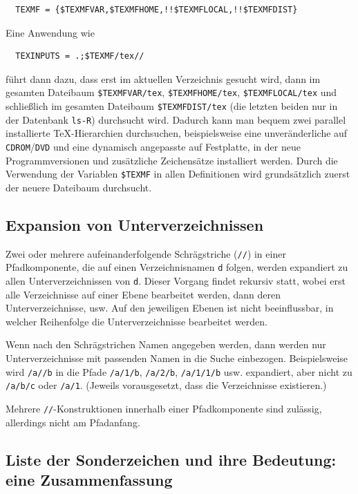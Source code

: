 \documentclass[12pt,ngerman,a4paper,fullparskip]{report}
\newcommand{\acro}[1]{\texttt{#1}}
\newcommand{\code}[1]{\texttt{#1}}
\newcommand{\file}[1]{\texttt{#1}}
\newcommand{\dirname}[1]{\texttt{#1}}
\newcommand{\var}[1]{\texttt{#1}}
\providecommand*{\DVD}{\acro{DVD}\xspace}
\begin{document}
\begin{verbatim}
  TEXMF = {$TEXMFVAR,$TEXMFHOME,!!$TEXMFLOCAL,!!$TEXMFDIST}
\end{verbatim}

Eine Anwendung wie

\begin{verbatim}
  TEXINPUTS = .;$TEXMF/tex//
\end{verbatim}

führt dann dazu, dass erst im aktuellen Verzeichnis gesucht wird, dann
im gesamten Dateibaum \code{\$TEXMFVAR/tex}, \code{\$TEXMFHOME/tex}, \code{\$TEXMFLOCAL/tex} und schließlich im gesamten Dateibaum \dirname{\$TEXMFDIST/tex} (die letzten beiden nur in der Datenbank \file{ls-R}) durchsucht wird. Dadurch kann man bequem zwei parallel installierte \TeX-Hierarchien durchsuchen, beispielsweise eine unveränderliche auf \acro{CDROM}/{\DVD} und eine dynamisch angepasste auf Festplatte, in der neue Programmversionen und zusätzliche Zeichensätze installiert werden. Durch die Verwendung der Variablen \code{\$TEXMF} in allen Definitionen wird grundsätzlich zuerst der neuere Dateibaum durchsucht.


\subsection{Expansion von Unterverzeichnissen}\label{sec:subdirectory-expansion}

Zwei oder mehrere aufeinanderfolgende Schrägstriche (\texttt{//}) in einer Pfadkomponente, die auf einen Verzeichnisnamen \var{d} folgen, werden expandiert zu allen Unterverzeichnissen von \var{d}. Dieser Vorgang findet rekursiv statt, wobei erst alle Verzeichnisse auf einer Ebene bearbeitet werden, dann deren Unterverzeichnisse, usw. Auf den jeweiligen Ebenen ist nicht beeinflussbar, in welcher Reihenfolge die Unterverzeichnisse bearbeitet werden.

Wenn nach den Schrägstrichen Namen angegeben werden, dann werden nur
Unterverzeichnisse mit passenden Namen in die Suche einbezogen. Beispielsweise wird \code{/a//b} in die Pfade \file{/a/1/b}, \file{/a/2/b}, \file{/a/1/1/b} usw. expandiert, aber nicht zu \file{/a/b/c} oder \file{/a/1}. (Jeweils vorausgesetzt, dass die Verzeichnisse existieren.)

Mehrere \code{//}-Konstruktionen innerhalb einer Pfadkomponente
sind zulässig, allerdings nicht am Pfadanfang.


\subsection{Liste der Sonderzeichen und ihre Bedeutung: eine Zusammenfassung}
\end{document}
